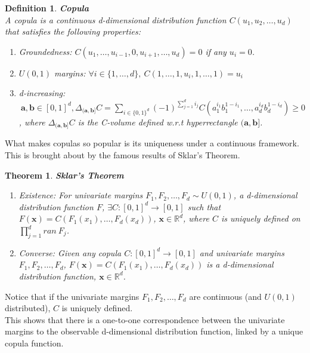 \documentclass[12pt]{report}
\newtheorem{theorem}{Theorem}[subsection]
\newtheorem{definition}{Definition}[subsection]
\newcommand{\1}{\mathbf{1}}
\begin{document}
\begin{flushleft}
\begin{definition}\label{CopProperties}
\textbf{Copula} \\
A copula is a continuous d-dimensional distribution function $C(u_{1}, u_{2}, \dots, u_{d}) $ that satisfies the following properties: \\
\begin{enumerate}
    \item Groundedness: \: $C(u_{1}, \dots, u_{i-1}, 0, u_{i+1}, \dots, u_{d}) = 0$ if any $u_{i} = 0$.\\
    \item $U(0,1)$ margins: \: $\forall i \in \{1, \dots,d\}, \: C(1, \dots, 1, u_{i}, 1, \dots, 1) = u_{i}$\\
    \item d-increasing: $\: \textbf{a}, \textbf{b} \in [0,1]^{d}, \Delta_{(\textbf{a},\textbf{b}]}C = \sum\limits_{i \in \{0,1\}^{d}} (-1)^{\sum_{j=1}^{d}i_{j}}C(a_{1}^{i_{1}}b_{1}^{1-i_{1}}, \dots, a_{d}^{i_{d}}b_{d}^{1-i_{d}})  \ge 0 $, \: where $\Delta_{(\textbf{a},\textbf{b}]}C$ is the C-volume defined w.r.t hyperrectangle $(\textbf{a},\textbf{b}]$.
\end{enumerate}
\end{definition}


What makes copulas so popular is its uniqueness under a continuous framework. This is brought about by the famous results of Sklar's Theorem.

\begin{theorem}\label{SklarTheorem}
\textit{\normalfont \parencite{SklarTheorem}}
\textbf{Sklar's Theorem}
\vspace{-0.2cm}
\begin{enumerate}
    \item Existence: For univariate margins $F_{1}, F_{2}, \dots, F_{d} \sim U(0,1)$, a d-dimensional distribution function $F$, $\exists C: [0,1]^{d} \rightarrow [0,1]$ such that $F(\textbf{x}) = C(F_{1}(x_{1}), \dots, F_{d}(x_{d}))$, $\textbf{x} \in \mathbb{R}^{d}$, where $C$ is uniquely defined on $\prod_{j=1}^{d} ran \: F_{j}$.
    \item Converse: Given any copula $C: [0,1]^{d} \rightarrow [0,1]$ and univariate margins $F_{1}, F_{2}, \dots, F_{d}$, $F(\textbf{x}) = C(F_{1}(x_{1}), \dots, F_{d}(x_{d}))$ is a d-dimensional distribution function, $\textbf{x} \in \mathbb{R}^{d}$.
\end{enumerate}
\end{theorem}
Notice that if the univariate margins $F_{1}, F_{2}, \dots, F_{d}$ are continuous (and $U(0,1)$ distributed), $C$ is uniquely defined. \\
\vspace{0.5cm}
This shows that there is a one-to-one correspondence between the univariate margins to the observable d-dimensional distribution function, linked by a unique copula function. \\
\vspace{0.5cm}


\end{flushleft}
\end{document}
